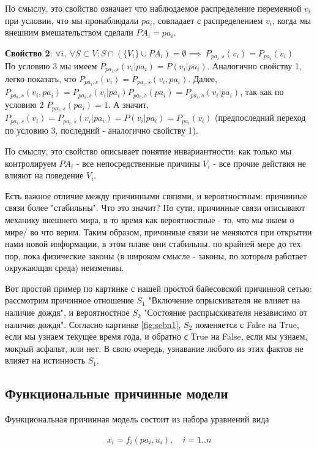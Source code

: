 \documentclass[fleqn]{article}
\begin{document}
По смыслу, это свойство означает что наблюдаемое распределение переменной $v_i$ при условии, что мы пронаблюдали $pa_i$, совпадает с распределением $v_i$, когда мы внешним вмешательством сделали $PA_i = pa_i$.

\textbf{Свойство 2}: $\forall i, \ \forall S \subset V: S \cap (\{V_i\} \cup PA_i) = \emptyset \implies \ P_{pa_i, s}(v_i) = P_{pa_i}(v_i)$\\
По условию 3 мы имеем $P_{pa_i,s}(v_i|pa_i) = P(v_i|pa_i)$.
Аналогично свойству 1, легко показать, что $P_{pa_i,s}(v_i) = P_{pa_i,s}(v_i, pa_i)$. Далее, $P_{pa_i,s}(v_i, pa_i) = P_{pa_i,s}(v_i|pa_i)P_{pa_i,s}(pa_i) = P_{pa_i,s}(v_i|pa_i)$, так как по условию 2 $P_{pa_i,s}(pa_i) = 1$. А значит, $P_{pa_i,s}(v_i) = P_{pa_i,s}(v_i|pa_i) = P(v_i|pa_i) = P_{pa_i}(v_i)$ (предпоследний переход по условию 3, последний - аналогично свойству 1).

По смыслу, это свойство описывает понятие инвариантности: как только мы контролируем $PA_i$ - все непосредственные причины $V_i$ - все прочие действия не влияют на поведение $V_i$.

Есть важное отличие между причинными связями, и вероятностным: причинные связи более "стабильны". Что это значит? По сути, причинные связи описывают механику внешнего мира, в то время как вероятностные - то, что мы знаем о мире/ во что верим. Таким образом, причинные связи не меняются при открытии нами новой информации, в этом плане они стабильны, по крайней мере до тех пор, пока физические законы (в широком смысле - законы, по которым работает окружающая среда) неизменны.

Вот простой пример по картинке с нашей простой байесовской причинной сетью: рассмотрим причинное отношение $S_1$ "Включение опрыскивателя не влияет на наличие дождя", и вероятностное $S_2$ "Состояние распрыскивателя независимо от наличия дождя". Согласно картинке \ref{fig:scbn1}, $S_2$ поменяется с False на True, если мы узнаем текущее время года, и обратно с True на False, если мы узнаем, мокрый асфальт, или нет. В свою очередь, узнавание любого из этих фактов не влияет на истинность $S_1$. 

\subsection*{Функциональные причинные модели}

Функциональная причинная модель состоит из набора уравнений вида 

\begin{align}
	x_i = f_i(pa_i, u_i),& \  i=1..n
\end{align}
\end{document}
